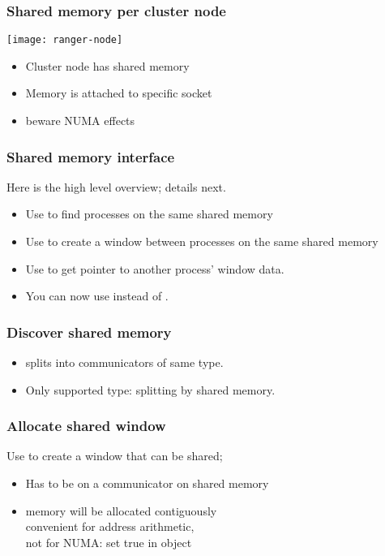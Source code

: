 \begin{frame}[containsverbatim]\frametitle{Shared memory per cluster node}
  \texttt{[image: ranger-node]}
  \begin{itemize}
  \item Cluster node has shared memory
  \item Memory is attached to specific socket
  \item beware \ac{NUMA} effects
  \end{itemize}
\end{frame}

\begin{frame}[containsverbatim]\frametitle{Shared memory interface}
  Here is the high level overview; details next.
  \begin{itemize}
  \item Use  to find processes on the same
    shared memory
  \item Use  to create a window between
    processes on the same shared memory
  \item Use  to get pointer to another
    process' window data.
  \item You can now use  instead of .
  \end{itemize}
\end{frame}

\begin{frame}[containsverbatim]\frametitle{Discover shared memory}
  \begin{itemize}
  \item
     splits into communicators of same type.
  \item Only supported type:  splitting by
    shared memory.
  \end{itemize}

\end{frame}

\begin{frame}[containsverbatim]\frametitle{Allocate shared window}
Use  to create a window that can
be shared;
\begin{itemize}
\item Has to be on a communicator on shared memory
\item memory will be allocated contiguously\\
  convenient for address arithmetic,\\ not for NUMA:
  set  true in
   object
\end{itemize}
\end{frame}

